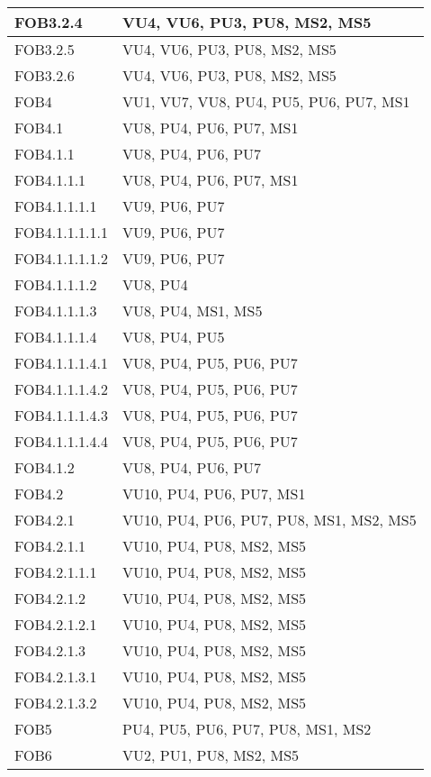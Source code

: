 {{\begin{longtable}{p{} p{}}
\midrule
FOB3.2.4		& 	{VU4, VU6, PU3, PU8, MS2, MS5}\\
\midrule
FOB3.2.5		& 	{VU4, VU6, PU3, PU8, MS2, MS5}\\
\midrule
FOB3.2.6		& 	{VU4, VU6, PU3, PU8, MS2, MS5}\\
\midrule
FOB4		& 	{VU1, VU7, VU8, PU4, PU5, PU6, PU7, MS1}\\
\midrule
FOB4.1		& 	{VU8, PU4, PU6, PU7, MS1}\\
\midrule
FOB4.1.1		& 	{VU8, PU4, PU6, PU7}\\
\midrule
FOB4.1.1.1		& 	{VU8, PU4, PU6, PU7, MS1}\\
\midrule
FOB4.1.1.1.1		& 	{VU9, PU6, PU7}\\
\midrule
FOB4.1.1.1.1.1		& 	{VU9, PU6, PU7}\\
\midrule
FOB4.1.1.1.1.2		& 	{VU9, PU6, PU7}\\
\midrule
FOB4.1.1.1.2		& 	{VU8, PU4}\\
\midrule
FOB4.1.1.1.3		& 	{VU8, PU4, MS1, MS5}\\
\midrule
FOB4.1.1.1.4		& 	{VU8, PU4, PU5}\\
\midrule
FOB4.1.1.1.4.1		& 	{VU8, PU4, PU5, PU6, PU7}\\
\midrule
FOB4.1.1.1.4.2		& 	{VU8, PU4, PU5, PU6, PU7}\\
\midrule
FOB4.1.1.1.4.3		& 	{VU8, PU4, PU5, PU6, PU7}\\
\midrule
FOB4.1.1.1.4.4		& 	{VU8, PU4, PU5, PU6, PU7}\\
\midrule
FOB4.1.2		& 	{VU8, PU4, PU6, PU7}\\
\midrule
FOB4.2		& 	{VU10, PU4, PU6, PU7, MS1}\\
\midrule
FOB4.2.1		& 	{VU10, PU4, PU6, PU7, PU8, MS1, MS2, MS5}\\
\midrule
FOB4.2.1.1		& 	{VU10, PU4, PU8, MS2, MS5}\\
\midrule
FOB4.2.1.1.1		& 	{VU10, PU4, PU8, MS2, MS5}\\
\midrule
FOB4.2.1.2		& 	{VU10, PU4, PU8, MS2, MS5}\\
\midrule
FOB4.2.1.2.1		& 	{VU10, PU4, PU8, MS2, MS5}\\
\midrule
FOB4.2.1.3		& 	{VU10, PU4, PU8, MS2, MS5}\\
\midrule
FOB4.2.1.3.1		& 	{VU10, PU4, PU8, MS2, MS5}\\
\midrule
FOB4.2.1.3.2		& 	{VU10, PU4, PU8, MS2, MS5}\\
\midrule
FOB5		& 	{PU4, PU5, PU6, PU7, PU8, MS1, MS2}\\
\midrule
FOB6		& 	{VU2, PU1, PU8, MS2, MS5}\\

\end{longtable}}}
